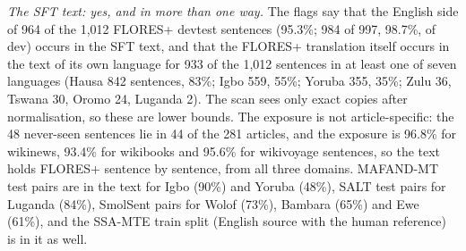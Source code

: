 \emph{The SFT text: yes, and in more than one way.} The flags say that the English side of 964 of the 1,012 FLORES+ devtest sentences (95.3\%; 984 of 997, 98.7\%, of dev) occurs in the SFT text, and that the FLORES+ translation itself occurs in the text of its own language for 933 of the 1,012 sentences in at least one of seven languages (Hausa 842 sentences, 83\%; Igbo 559, 55\%; Yoruba 355, 35\%; Zulu 36, Tswana 30, Oromo 24, Luganda 2). The scan sees only exact copies after normalisation, so these are lower bounds. The exposure is not article-specific: the 48 never-seen sentences lie in 44 of the 281 articles, and the exposure is 96.8\% for wikinews, 93.4\% for wikibooks and 95.6\% for wikivoyage sentences, so the text holds FLORES+ sentence by sentence, from all three domains. MAFAND-MT test pairs are in the text for Igbo (90\%) and Yoruba (48\%), SALT test pairs for Luganda (84\%), SmolSent pairs for Wolof (73\%), Bambara (65\%) and Ewe (61\%), and the SSA-MTE train split (English source with the human reference) is in it as well.

